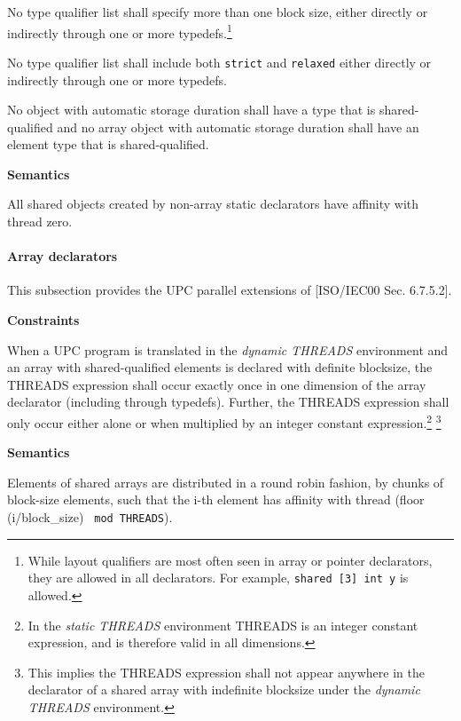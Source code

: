 \np No type qualifier list shall specify more than one block
    size, either directly or indirectly through one or more
    typedefs.\footnote{While layout qualifiers are most often seen in
    array or pointer declarators, they are allowed in all declarators.  For
    example, {\tt shared [3] int y} is allowed.}

\np No type qualifier list shall include both {\tt strict}
    and {\tt relaxed} either directly or indirectly through one or
    more typedefs.

\np No object with automatic storage duration shall have a type
    that is shared-qualified and no array object with automatic
    storage duration shall have an element type that is shared-qualified.

{\bf Semantics} 

\np All shared objects created by non-array static declarators have
    affinity with thread zero.

\paragraph{Array declarators}
\label{shared_array}
\npf This subsection provides the UPC parallel extensions of
     [ISO/IEC00 Sec. 6.7.5.2].

{\bf Constraints} 

\np When a UPC program is translated in the {\em dynamic
    THREADS} environment and an array with shared-qualified elements
    is declared with definite blocksize, the THREADS expression shall
    occur exactly once in one dimension of the array declarator
    (including through typedefs).  Further, the THREADS expression
    shall only occur either alone or when multiplied by an integer
    constant expression.\footnote{In the {\em static THREADS} environment
    THREADS is an integer constant expression, and is therefore valid in
    all dimensions.} \footnote{This implies the THREADS expression
    shall not appear anywhere in the declarator of a shared array with
    indefinite blocksize under the {\em dynamic THREADS} environment.}


{\bf Semantics} 

\np Elements of shared arrays are distributed in a round
    robin fashion, by chunks of block-size elements, such that the
    i-th element has affinity with thread (floor (i/block\_size) {\tt
    mod THREADS}).

